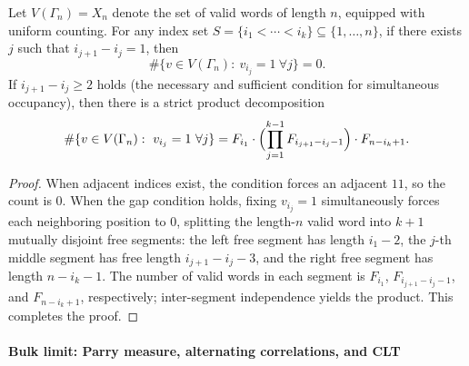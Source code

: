 \begin{theorem}\label{thm:pom-fibcube-kpoint-count}
Let \(V(\Gamma_n)=X_n\) denote the set of valid words of length \(n\), equipped with uniform counting.
For any index set \(S=\{i_1<\cdots<i_k\}\subseteq\{1,\dots,n\}\), if there exists \(j\) such that \(i_{j+1}-i_j=1\), then
\[
\#\{v\in V(\Gamma_n):\ v_{i_j}=1\ \forall j\}=0.
\]
If \(i_{j+1}-i_j\ge 2\) holds (the necessary and sufficient condition for simultaneous occupancy), then there is a strict product decomposition
\[
\#\{v\in V(\Gamma_n):\ v_{i_j}=1\ \forall j\}
=
F_{i_1}\cdot
\Bigl(\prod_{j=1}^{k-1}F_{i_{j+1}-i_j-1}\Bigr)\cdot
F_{n-i_k+1}.
\]
\end{theorem}
\begin{proof}
When adjacent indices exist, the condition forces an adjacent \(11\), so the count is \(0\).
When the gap condition holds, fixing \(v_{i_j}=1\) simultaneously forces each neighboring position to \(0\), splitting the length-\(n\) valid word into \(k+1\) mutually disjoint free segments:
the left free segment has length \(i_1-2\), the \(j\)-th middle segment has free length \(i_{j+1}-i_j-3\), and the right free segment has length \(n-i_k-1\).
The number of valid words in each segment is \(F_{i_1}\), \(F_{i_{j+1}-i_j-1}\), and \(F_{n-i_k+1}\), respectively;
inter-segment independence yields the product. This completes the proof.
\end{proof}

\paragraph{Bulk limit: Parry measure, alternating correlations, and CLT}

